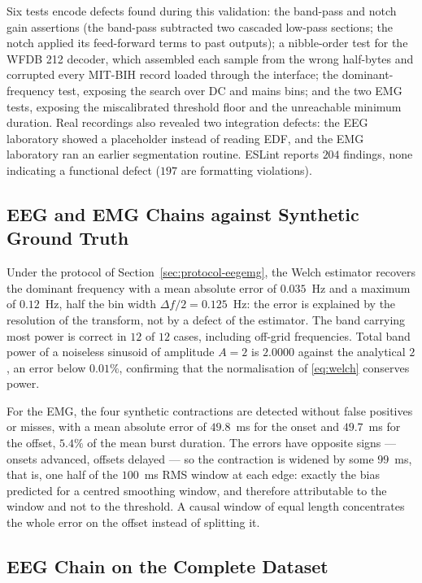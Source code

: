 \documentclass[conference]{IEEEtran}
\begin{document}
Six tests encode defects found during this validation: the band-pass and notch gain assertions (the band-pass subtracted two cascaded low-pass sections; the notch applied its feed-forward terms to past outputs); a nibble-order test for the WFDB 212 decoder, which assembled each sample from the wrong half-bytes and corrupted every MIT-BIH record loaded through the interface; the dominant-frequency test, exposing the search over DC and mains bins; and the two EMG tests, exposing the miscalibrated threshold floor and the unreachable minimum duration. Real recordings also revealed two integration defects: the EEG laboratory showed a placeholder instead of reading EDF, and the EMG laboratory ran an earlier segmentation routine. ESLint reports $204$ findings, none indicating a functional defect ($197$ are formatting violations).

\subsection{EEG and EMG Chains against Synthetic Ground Truth}
\label{sec:results-eegemg}

Under the protocol of Section~\ref{sec:protocol-eegemg}, the Welch estimator recovers the dominant frequency with a mean absolute error of $0.035$~Hz and a maximum of $0.12$~Hz, half the bin width $\Delta f/2=0.125$~Hz: the error is explained by the resolution of the transform, not by a defect of the estimator. The band carrying most power is correct in $12$ of $12$ cases, including off-grid frequencies. Total band power of a noiseless sinusoid of amplitude $A=2$ is $2.0000$ against the analytical $2$, an error below $0.01\%$, confirming that the normalisation of \eqref{eq:welch} conserves power.

For the EMG, the four synthetic contractions are detected without false positives or misses, with a mean absolute error of $49.8$~ms for the onset and $49.7$~ms for the offset, $5.4\%$ of the mean burst duration. The errors have opposite signs --- onsets advanced, offsets delayed --- so the contraction is widened by some $99$~ms, that is, one half of the $100$~ms RMS window at each edge: exactly the bias predicted for a centred smoothing window, and therefore attributable to the window and not to the threshold. A causal window of equal length concentrates the whole error on the offset instead of splitting it.

\subsection{EEG Chain on the Complete Dataset}
\label{sec:results-eegpop}
\end{document}
